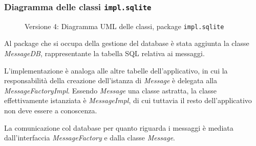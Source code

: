 \subsubsection{Diagramma delle classi \texttt{impl.sqlite}}
\vspace{0.5cm}
\begin{figure}[H]
    \centering
    \caption{Versione 4: Diagramma UML delle classi, package \texttt{impl.sqlite}}
    \label{fig:class_db_v_4}
\end{figure}

Al package che si occupa della gestione del database è stata aggiunta la classe \textit{MessageDB}, rappresentante la tabella SQL relativa ai messaggi.

L'implementazione è analoga alle altre tabelle dell'applicativo, in cui la responsabilità della creazione dell'istanza di \textit{Message} è delegata alla \textit{MessageFactoryImpl}.
Essendo \textit{Message} una classe astratta, la classe effettivamente istanziata è \textit{MessageImpl}, di cui tuttavia il resto dell'applicativo non deve essere a conoscenza.

La comunicazione col database per quanto riguarda i messaggi è mediata dall'interfaccia \textit{MessageFactory} e dalla classe \textit{Message}.